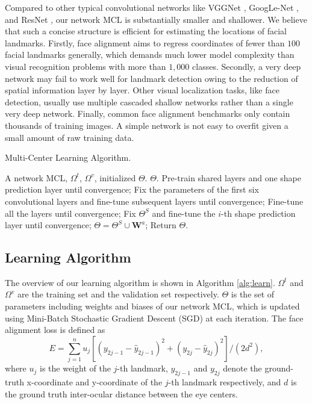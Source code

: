 \documentclass[journal]{IEEEtran}
\begin{document}
Compared to other typical convolutional networks like VGGNet \cite{simonyan2014very}, GoogLe-Net \cite{szegedy2015going}, and ResNet \cite{he2016deep}, our network MCL is substantially smaller and shallower. We believe that such a concise structure is efficient for estimating the locations of facial landmarks. Firstly, face alignment aims to regress coordinates of fewer than $100$ facial landmarks generally, which demands much lower model complexity than visual recognition problems with more than $1,000$ classes. Secondly, a very deep network may fail to work well for landmark detection owing to the reduction of spatial information layer by layer. Other visual localization tasks, like face detection, usually use multiple cascaded shallow networks rather than a single very deep network. Finally, common face alignment benchmarks only contain thousands of training images. A simple network is not easy to overfit given a small amount of raw training data.

\begin{algorithm}[!htb]
\caption{Multi-Center Learning Algorithm.}
\label{alg:learn}
\begin{algorithmic}[1]
\REQUIRE A network MCL, $\Omega^t$, $\Omega^v$, initialized $\Theta$.
\ENSURE $\Theta$.
\STATE Pre-train shared layers and one shape prediction layer until convergence;
\label{alg:learn:basic}
\STATE Fix the parameters of the first six convolutional layers and fine-tune subsequent layers until convergence;
\label{alg:learn:Fix_FT}
\STATE Fine-tune all the layers until convergence;
\label{alg:learn:FT_all}
\label{alg:learn:for_beg}
    \STATE Fix $\Theta^{S}$ and fine-tune the $i$-th shape prediction layer until convergence;
    \label{alg:learn:Fix_FT_i}
\ENDFOR
\label{alg:learn:for_end}
\STATE $\Theta=\Theta^{S} \cup \mathbf{W}^{a}$;
\label{alg:learn:combine}
\STATE Return $\Theta$.
\end{algorithmic}
\end{algorithm}

\subsection{Learning Algorithm}
\label{ssec:learning}

The overview of our learning algorithm is shown in Algorithm \ref{alg:learn}. $\Omega^t$ and $\Omega^v$ are the training set and the validation set respectively. $\Theta$ is the set of parameters including weights and biases of our network MCL, which is updated using Mini-Batch Stochastic Gradient Descent (SGD) \cite{krizhevsky2012imagenet} at each iteration. The face alignment loss is defined as
\begin{equation}
\label{eq:loss}
E=\sum_{j=1}^n u_j[(y_{2j-1}-\hat{y}_{2j-1})^2+(y_{2j}-\hat{y}_{2j})^2]/(2d^2),
\end{equation}
where $u_j$ is the weight of the $j$-th landmark, $y_{2j-1}$ and $y_{2j}$ denote the ground-truth x-coordinate and y-coordinate of the $j$-th landmark respectively, and $d$ is the ground truth inter-ocular distance between the eye centers.
\end{document}

